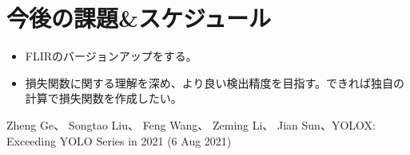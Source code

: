 \documentclass[a4j]{jarticle}
\begin{document}
	\section{今後の課題\&スケジュール}
		\begin{itemize}
			\item FLIRのバージョンアップをする。
			\item 損失関数に関する理解を深め、より良い検出精度を目指す。できれば独自の計算で損失関数を作成したい。
		\end{itemize}

\begin{thebibliography}{10}
	Zheng Ge、 Songtao Liu、 Feng Wang、 Zeming Li、 Jian Sun、YOLOX: Exceeding YOLO Series in 2021 (6 Aug 2021)
\end{thebibliography}
\end{document}
